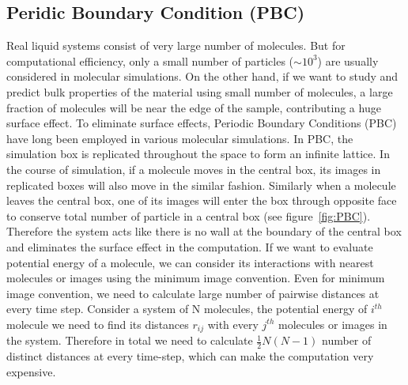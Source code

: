 \subsection{Peridic Boundary Condition (PBC)}
Real liquid systems consist of very large number of molecules. But for computational efficiency, only a small number of particles ($\sim 10^3$) are usually considered in molecular simulations. On the other hand, if we want to study and predict bulk properties of the material using small number of molecules, a large fraction of molecules will be near the edge of the sample, contributing a huge surface effect. To eliminate surface effects, Periodic Boundary Conditions (PBC) have long been employed in various molecular simulations.\cite{Born1912}
In PBC, the simulation box is replicated throughout the space to form an infinite lattice. In the course of simulation, if a molecule moves in the central box, its images in replicated boxes will also move in the similar fashion. Similarly when a molecule leaves the central box, one of its images will enter the box through opposite face to conserve total number of particle in a central box (see figure~\ref{fig:PBC}). Therefore the system acts like there is no wall at the boundary of the central box and eliminates the surface effect in the computation. If we want to evaluate potential energy of a molecule, we can consider its interactions with nearest molecules or images using the minimum image convention.\cite{Allen04} Even for minimum image convention, we need to calculate large number of pairwise distances at every time step. Consider a system of N molecules, the potential energy of $i^{th}$ molecule we need to find its distances $r_{ij}$ with every $j^{th}$ molecules or images in the system. Therefore in total we need to calculate $\frac{1}{2} N (N-1)$ number of distinct distances at every time-step, which can make the computation very expensive. 

